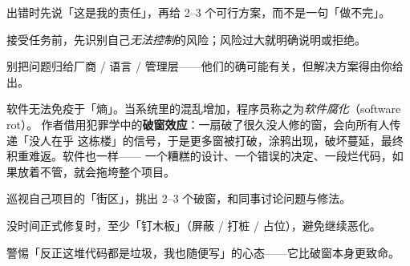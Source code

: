\begin{actions}
\item 出错时先说「这是我的责任」，再给 2--3 个可行方案，而不是一句「做不完」。
\item 接受任务前，先识别自己\emph{无法控制}的风险；风险过大就明确说明或拒绝。
\item 别把问题归给厂商 / 语言 / 管理层——他们的确可能有关，但解决方案得由你给出。
\end{actions}


\begin{ideabox}
软件无法免疫于「熵」。当系统里的混乱增加，程序员称之为\emph{软件腐化}（software rot）。
作者借用犯罪学中的\textbf{破窗效应}：一扇破了很久没人修的窗，会向所有人传递「没人在乎
这栋楼」的信号，于是更多窗被打破，涂鸦出现，破坏蔓延，最终积重难返。软件也一样——
一个糟糕的设计、一个错误的决定、一段烂代码，如果放着不管，就会拖垮整个项目。
\end{ideabox}


\begin{bitext}
\end{bitext}

\begin{actions}
\item 巡视自己项目的「街区」，挑出 2--3 个破窗，和同事讨论问题与修法。
\item 没时间正式修复时，至少「钉木板」（屏蔽 / 打桩 / 占位），避免继续恶化。
\item 警惕「反正这堆代码都是垃圾，我也随便写」的心态——它比破窗本身更致命。
\end{actions}


